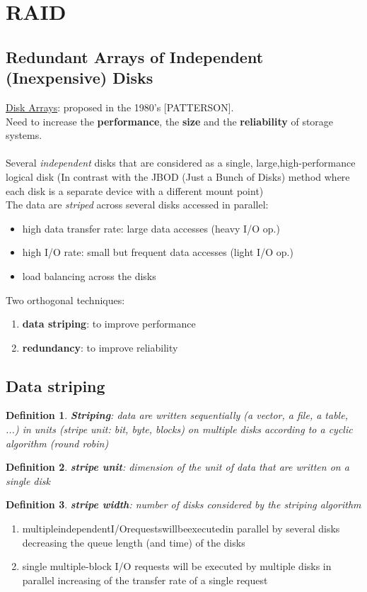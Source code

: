 \documentclass[10pt, oneside]{article}
\newtheorem{defn}{Definition}
\begin{document}
\newpage

\section{RAID}
\subsection*{Redundant Arrays of Independent (Inexpensive) Disks}
\underline{Disk Arrays}: proposed in the 1980’s [PATTERSON].\\
Need to increase the {\bf performance}, the {\bf size} and the {\bf reliability} of storage systems.\\\\
Several {\sl independent} disks that are considered as a single, large,high-performance logical disk (In contrast with the JBOD (Just a Bunch of Disks) method where each disk is a separate device with a different mount point)\\
The data are {\sl striped} across several disks accessed in parallel:\begin{itemize}
    \item high data transfer rate: large data accesses (heavy I/O op.)
    \item high I/O rate: small but frequent data accesses (light I/O op.)
    \item load balancing across the disks
\end{itemize}
Two orthogonal techniques:\begin{enumerate}
    \item {\bf data striping}: to improve performance
    \item {\bf redundancy}: to improve reliability
\end{enumerate}

\subsection{Data striping}
\begin{defn}
    {\bf Striping}: data are written sequentially (a vector, a file, a table, ...) in units (stripe unit: bit, byte, blocks) on multiple disks according to a cyclic algorithm ({\sl round robin})
\end{defn}
\begin{defn}
    {\bf stripe unit}: dimension of the unit of data that are written on a single disk
\end{defn}
\begin{defn}
    {\bf stripe width}: number of disks considered by the striping algorithm
\end{defn}\begin{enumerate}
    \item multipleindependentI/Orequestswillbeexecutedin parallel by several disks decreasing the queue length (and time) of the disks
    \item single multiple-block I/O requests will be executed by multiple disks in parallel increasing of the transfer rate of a single request
\end{enumerate}
\end{document}

